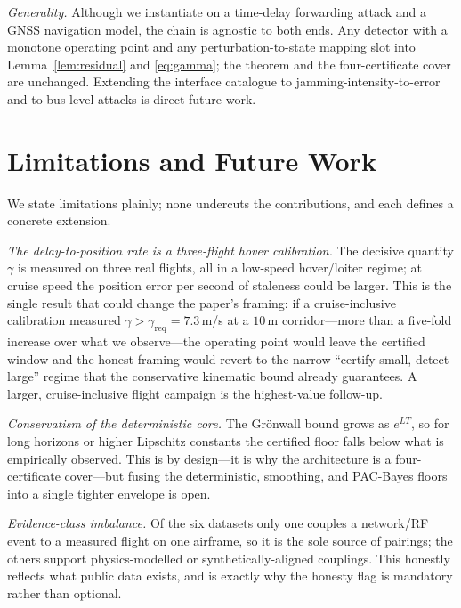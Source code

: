 \emph{Generality.} Although we instantiate on a time-delay forwarding attack and
a GNSS navigation model, the chain is agnostic to both ends. Any detector with a
monotone operating point and any perturbation-to-state mapping slot into
Lemma~\ref{lem:residual} and \eqref{eq:gamma}; the theorem and the
four-certificate cover are unchanged. Extending the interface catalogue to
jamming-intensity-to-error and to bus-level attacks is direct future work.

\section{Limitations and Future Work}
\label{sec:limitations}
We state limitations plainly; none undercuts the contributions, and each defines
a concrete extension.

\emph{The delay-to-position rate is a three-flight hover calibration.} The
decisive quantity $\gamma$ is measured on three real flights, all in a low-speed
hover/loiter regime; at cruise speed the position error per second of staleness
could be larger. This is the single result that could change the paper's
framing: if a cruise-inclusive calibration measured
$\gamma>\gamma_{\mathrm{req}}=7.3$\,m/s at a $10$\,m corridor---more than a
five-fold increase over what we observe---the operating point would leave the
certified window and the honest framing would revert to the narrow
``certify-small, detect-large'' regime that the conservative kinematic bound
already guarantees. A larger, cruise-inclusive flight campaign is the
highest-value follow-up.

\emph{Conservatism of the deterministic core.} The Gr\"onwall bound grows as
$e^{LT}$, so for long horizons or higher Lipschitz constants the certified floor
falls below what is empirically observed. This is by design---it is why the
architecture is a four-certificate cover---but fusing the deterministic,
smoothing, and PAC-Bayes floors into a single tighter envelope is open.

\emph{Evidence-class imbalance.} Of the six datasets only one couples a
network/RF event to a measured flight on one airframe, so it is the sole source
of  pairings; the others support physics-modelled
or synthetically-aligned couplings. This honestly reflects what public data
exists, and is exactly why the honesty flag is mandatory rather than optional.

